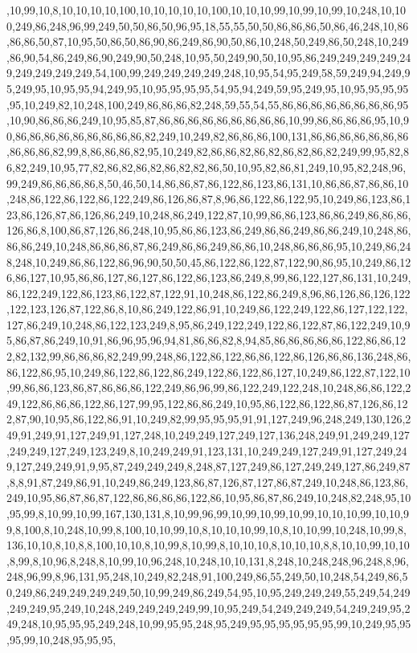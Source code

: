 ,10,99,10,8,10,10,10,10,100,10,10,10,10,10,100,10,10,10,99,10,99,10,99,10,248,10,100,249,86,248,96,99,249,50,50,86,50,96,95,18,55,55,50,50,86,86,86,50,86,46,248,10,86,86,86,50,87,10,95,50,86,50,86,90,86,249,86,90,50,86,10,248,50,249,86,50,248,10,249,86,90,54,86,249,86,90,249,90,50,248,10,95,50,249,90,50,10,95,86,249,249,249,249,249,249,249,249,249,54,100,99,249,249,249,249,248,10,95,54,95,249,58,59,249,94,249,95,249,95,10,95,95,94,249,95,10,95,95,95,95,54,95,94,249,59,95,249,95,10,95,95,95,95,95,10,249,82,10,248,100,249,86,86,86,82,248,59,55,54,55,86,86,86,86,86,86,86,86,95,10,90,86,86,86,249,10,95,85,87,86,86,86,86,86,86,86,86,86,10,99,86,86,86,86,95,10,90,86,86,86,86,86,86,86,86,86,82,249,10,249,82,86,86,86,100,131,86,86,86,86,86,86,86,86,86,86,82,99,8,86,86,86,82,95,10,249,82,86,86,82,86,82,86,82,86,82,249,99,95,82,86,82,249,10,95,77,82,86,82,86,82,86,82,82,86,50,10,95,82,86,81,249,10,95,82,248,96,99,249,86,86,86,86,8,50,46,50,14,86,86,87,86,122,86,123,86,131,10,86,86,87,86,86,10,248,86,122,86,122,86,122,249,86,126,86,87,8,96,86,122,86,122,95,10,249,86,123,86,123,86,126,87,86,126,86,249,10,248,86,249,122,87,10,99,86,86,123,86,86,249,86,86,86,126,86,8,100,86,87,126,86,248,10,95,86,86,123,86,249,86,86,249,86,86,249,10,248,86,86,86,249,10,248,86,86,86,87,86,249,86,86,249,86,86,10,248,86,86,86,95,10,249,86,248,248,10,249,86,86,122,86,96,90,50,50,45,86,122,86,122,87,122,90,86,95,10,249,86,126,86,127,10,95,86,86,127,86,127,86,122,86,123,86,249,8,99,86,122,127,86,131,10,249,86,122,249,122,86,123,86,122,87,122,91,10,248,86,122,86,249,8,96,86,126,86,126,122,122,123,126,87,122,86,8,10,86,249,122,86,91,10,249,86,122,249,122,86,127,122,122,127,86,249,10,248,86,122,123,249,8,95,86,249,122,249,122,86,122,87,86,122,249,10,95,86,87,86,249,10,91,86,96,95,96,94,81,86,86,82,8,94,85,86,86,86,86,86,122,86,86,122,82,132,99,86,86,86,82,249,99,248,86,122,86,122,86,86,122,86,126,86,86,136,248,86,86,122,86,95,10,249,86,122,86,122,86,249,122,86,122,86,127,10,249,86,122,87,122,10,99,86,86,123,86,87,86,86,86,122,249,86,96,99,86,122,249,122,248,10,248,86,86,122,249,122,86,86,86,122,86,127,99,95,122,86,86,249,10,95,86,122,86,122,86,87,126,86,122,87,90,10,95,86,122,86,91,10,249,82,99,95,95,95,91,91,127,249,96,248,249,130,126,249,91,249,91,127,249,91,127,248,10,249,249,127,249,127,136,248,249,91,249,249,127,249,249,127,249,123,249,8,10,249,249,91,123,131,10,249,249,127,249,91,127,249,249,127,249,249,91,9,95,87,249,249,249,8,248,87,127,249,86,127,249,249,127,86,249,87,8,8,91,87,249,86,91,10,249,86,249,123,86,87,126,87,127,86,87,249,10,248,86,123,86,249,10,95,86,87,86,87,122,86,86,86,86,122,86,10,95,86,87,86,249,10,248,82,248,95,10,95,99,8,10,99,10,99,167,130,131,8,10,99,96,99,10,99,10,99,10,99,10,10,10,99,10,10,99,8,100,8,10,248,10,99,8,100,10,10,99,10,8,10,10,10,99,10,8,10,10,99,10,248,10,99,8,136,10,10,8,10,8,8,100,10,10,8,10,99,8,10,99,8,10,10,10,8,10,10,10,8,8,10,10,99,10,10,8,99,8,10,96,8,248,8,10,99,10,96,248,10,248,10,10,131,8,248,10,248,248,96,248,8,96,248,96,99,8,96,131,95,248,10,249,82,248,91,100,249,86,55,249,50,10,248,54,249,86,50,249,86,249,249,249,249,50,10,99,249,86,249,54,95,10,95,249,249,249,55,249,54,249,249,249,95,249,10,248,249,249,249,249,99,10,95,249,54,249,249,249,54,249,249,95,249,248,10,95,95,95,249,248,10,99,95,95,248,95,249,95,95,95,95,95,95,99,10,249,95,95,95,99,10,248,95,95,95,